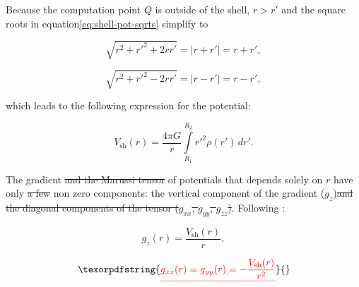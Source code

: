 \documentclass[extra, referee]{gji}
\providecommand{\DIFaddtex}[1]{{\protect\color{blue}\uwave{#1}}} %
\providecommand{\DIFdeltex}[1]{{\protect\color{red}\sout{#1}}}                      %
\providecommand{\DIFaddbegin}{} %
\providecommand{\DIFaddend}{} %
\providecommand{\DIFdelbegin}{} %
\providecommand{\DIFdelend}{} %
\providecommand{\DIFadd}[1]{\texorpdfstring{\DIFaddtex{#1}}{#1}} %
\providecommand{\DIFdel}[1]{\texorpdfstring{\DIFdeltex{#1}}{}} %
\newcommand{\DIFscaledelfig}{0.5}
\newlength{\DIFdelgraphicswidth} %
\newlength{\DIFdelgraphicsheight} %
\newcommand{\DIFaddincludegraphics}[2][]{{\color{blue}\fbox{\DIFOincludegraphics[#1]{#2}}}} %
\newcommand{\DIFdelincludegraphics}[2][]{%
\sbox{\DIFdelgraphicsbox}{\DIFOincludegraphics[#1]{#2}}%
\settoboxwidth{\DIFdelgraphicswidth}{\DIFdelgraphicsbox} %
\settoboxtotalheight{\DIFdelgraphicsheight}{\DIFdelgraphicsbox} %
\scalebox{\DIFscaledelfig}{%
\parbox[b]{\DIFdelgraphicswidth}{\usebox{\DIFdelgraphicsbox}\\[-\baselineskip] \rule{\DIFdelgraphicswidth}{0em}}\llap{\resizebox{\DIFdelgraphicswidth}{\DIFdelgraphicsheight}{%
\setlength{\unitlength}{\DIFdelgraphicswidth}%
\begin{picture}(1,1)%
\thicklines\linethickness{2pt} %
{\color[rgb]{1,0,0}\put(0,0){\framebox(1,1){}}}%
{\color[rgb]{1,0,0}\put(0,0){\line( 1,1){1}}}%
{\color[rgb]{1,0,0}\put(0,1){\line(1,-1){1}}}%
\end{picture}%
}\hspace*{3pt}}} %
} %
\DeclareRobustCommand{\DIFaddbegin}{\DIFOaddbegin \let\includegraphics\DIFaddincludegraphics} %
\DeclareRobustCommand{\DIFaddend}{\DIFOaddend \let\includegraphics\DIFOincludegraphics} %
\DeclareRobustCommand{\DIFdelbegin}{\DIFOdelbegin \let\includegraphics\DIFdelincludegraphics} %
\DeclareRobustCommand{\DIFdelend}{\DIFOaddend \let\includegraphics\DIFOincludegraphics} %
\begin{document}

Because the computation point $Q$ is outside of the shell, $r > r'$ and the square roots
in equation\DIFaddbegin \DIFadd{~}\DIFaddend \ref{eq:shell-pot-sqrts} simplify to

\begin{equation}
    \sqrt{r^2 + r'^2 + 2rr'} = |r + r'| = r + r',
\end{equation}

\begin{equation}
    \sqrt{r^2 + r'^2 - 2rr'} = |r - r'| = r - r',
\end{equation}

\noindent which leads to the following expression for the potential:

\begin{equation}
    V_\text{sh}(r) = \frac{4\pi G}{r}
    \int\limits_{R_1}^{R_2} {r'}^2 \rho(r') \, dr'.
\label{eq:shell-pot}
\end{equation}

The gradient \DIFdelbegin \DIFdel{and the Marussi tensor }\DIFdelend of potentials that
depends solely on $r$ have only \DIFdelbegin \DIFdel{a few }\DIFdelend \DIFaddbegin \DIFadd{one }\DIFaddend non zero components: the vertical
component of the gradient ($g_z$)\DIFdelbegin \DIFdel{and the diagonal components of the
tensor ($g_{xx}$, $g_{yy}$, $g_{zz}$)}\DIFdelend .
Following \citet{Grombein2013}:

\begin{equation}
    g_z(r) = \frac{V_\text{sh}(r)}{r},
\DIFaddbegin \label{eq:shell-gz}
\DIFaddend \end{equation}

\DIFdelbegin \begin{displaymath}
    \DIFdel{g_{xx}(r) = g_{yy}(r) = -\frac{V_\text{sh}(r)}{r^2}
}\end{displaymath}%
\end{document}

